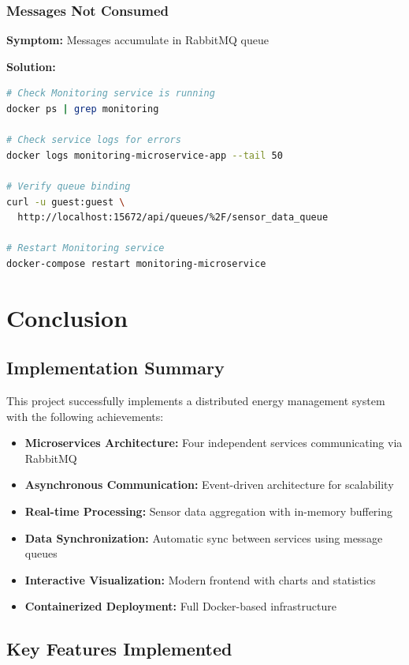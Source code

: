\documentclass[12pt,a4paper]{article}
\begin{document}
\subsubsection{Messages Not Consumed}

\textbf{Symptom:} Messages accumulate in RabbitMQ queue

\textbf{Solution:}
\begin{lstlisting}[language=bash]
# Check Monitoring service is running
docker ps | grep monitoring

# Check service logs for errors
docker logs monitoring-microservice-app --tail 50

# Verify queue binding
curl -u guest:guest \
  http://localhost:15672/api/queues/%2F/sensor_data_queue

# Restart Monitoring service
docker-compose restart monitoring-microservice
\end{lstlisting}

\newpage


\section{Conclusion}

\subsection{Implementation Summary}

This project successfully implements a distributed energy management system with the following achievements:

\begin{itemize}
    \item \textbf{Microservices Architecture:} Four independent services communicating via RabbitMQ
    \item \textbf{Asynchronous Communication:} Event-driven architecture for scalability
    \item \textbf{Real-time Processing:} Sensor data aggregation with in-memory buffering
    \item \textbf{Data Synchronization:} Automatic sync between services using message queues
    \item \textbf{Interactive Visualization:} Modern frontend with charts and statistics
    \item \textbf{Containerized Deployment:} Full Docker-based infrastructure
\end{itemize}

\subsection{Key Features Implemented}
\end{document}
